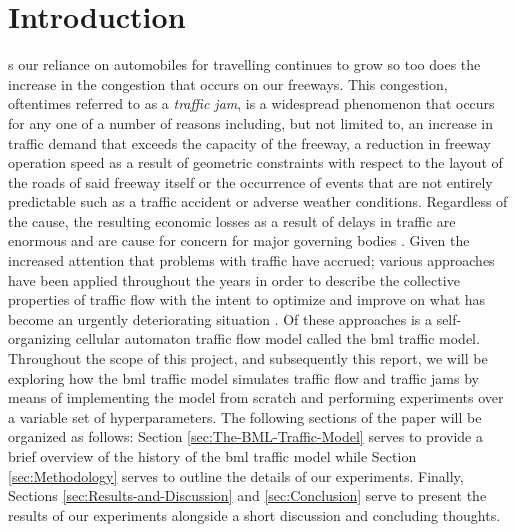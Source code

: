 \IEEEraisesectionheading
{
\section{Introduction}
\label{sec:Introduction}
}
s our reliance on automobiles for travelling continues to grow so too does the increase in the congestion that occurs on our freeways. This congestion, oftentimes referred to as a \textit{traffic jam}, is a widespread phenomenon that occurs for any one of a number of reasons including, but not limited to, an increase in traffic demand that exceeds the capacity of the freeway, a reduction in freeway operation speed as a result of geometric constraints with respect to the layout of the roads of said freeway itself or the occurrence of events that are not entirely predictable such as a traffic accident or adverse weather conditions. Regardless of the cause, the resulting economic losses as a result of delays in traffic are enormous and are cause for concern for major governing bodies \cite{DYin}. Given the increased attention that problems with traffic have accrued; various approaches have been applied throughout the years in order to describe the collective properties of traffic flow \cite{Nagatani} with the intent to optimize and improve on what has become an urgently deteriorating situation \cite{Helbing}. Of these approaches is a self-organizing cellular automaton traffic flow model called the \gls{bml} traffic model. Throughout the scope of this project, and subsequently this report, we will be exploring how the \gls{bml} traffic model simulates traffic flow and traffic jams by means of implementing the model from scratch and performing experiments over a variable set of hyperparameters. The following sections of the paper will be organized as follows: Section \ref{sec:The-BML-Traffic-Model} serves to provide a brief overview of the history of the \gls{bml} traffic model while Section \ref{sec:Methodology} serves to outline the details of our experiments. Finally, Sections \ref{sec:Results-and-Discussion} and \ref{sec:Conclusion} serve to present the results of our experiments alongside a short discussion and concluding thoughts.